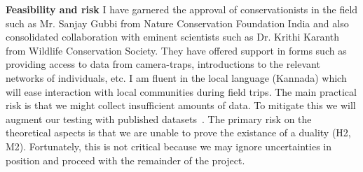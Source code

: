 \documentclass[a4paper,10pt,twocolumn]{article}
\newcommand{\hdg}[1] {\noindent \textbf{#1} }
\begin{document}
\hdg{Feasibility and risk}
I have garnered the approval of conservationists in the field such as Mr. Sanjay Gubbi from Nature Conservation Foundation India and also consolidated collaboration with eminent scientists such as Dr. Krithi Karanth from Wildlife Conservation Society. They have offered support in forms such as providing access to data from camera-traps, introductions to the relevant networks of individuals, etc. I am fluent in the local language (Kannada) which will ease interaction with local communities during field trips. The main practical risk is that we might collect insufficient amounts of data. To mitigate this we will augment our testing with published datasets~\cite{yu2013automated}. The primary risk on the theoretical aspects is that we are unable to prove the existance of a duality (H2, M2). Fortunately, this is not critical because we may ignore uncertainties in position and proceed with the remainder of the project.



% 
% 
% 
% 
% 
% 
% 
% 



\vspace{-1em}
% 
{  }

\end{document}

